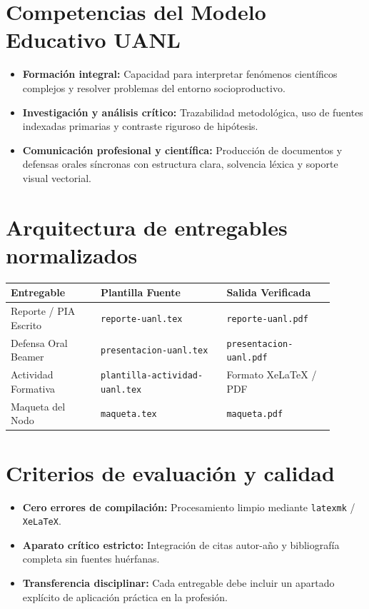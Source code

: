 \documentclass[12pt]{article}
\begin{document}
\section*{Competencias del Modelo Educativo UANL}
\begin{itemize}[leftmargin=*]
  \item \textbf{Formación integral:} Capacidad para interpretar fenómenos científicos complejos y resolver problemas del entorno socioproductivo.
  \item \textbf{Investigación y análisis crítico:} Trazabilidad metodológica, uso de fuentes indexadas primarias y contraste riguroso de hipótesis.
  \item \textbf{Comunicación profesional y científica:} Producción de documentos y defensas orales síncronas con estructura clara, solvencia léxica y soporte visual vectorial.
\end{itemize}

\section*{Arquitectura de entregables normalizados}
\begin{center}
\begin{tabular}{p{0.25\linewidth} p{0.35\linewidth} p{0.30\linewidth}}
\toprule
\textbf{Entregable} & \textbf{Plantilla Fuente} & \textbf{Salida Verificada} \\
\midrule
Reporte / PIA Escrito & \texttt{reporte-uanl.tex} & \texttt{reporte-uanl.pdf} \\
Defensa Oral Beamer & \texttt{presentacion-uanl.tex} & \texttt{presentacion-uanl.pdf} \\
Actividad Formativa & \texttt{plantilla-actividad-uanl.tex} & Formato XeLaTeX / PDF \\
Maqueta del Nodo & \texttt{maqueta.tex} & \texttt{maqueta.pdf} \\
\bottomrule
\end{tabular}
\end{center}

\section*{Criterios de evaluación y calidad}
\begin{itemize}[leftmargin=*]
  \item \textbf{Cero errores de compilación:} Procesamiento limpio mediante \texttt{latexmk} / \texttt{XeLaTeX}.
  \item \textbf{Aparato crítico estricto:} Integración de citas autor-año y bibliografía completa sin fuentes huérfanas.
  \item \textbf{Transferencia disciplinar:} Cada entregable debe incluir un apartado explícito de aplicación práctica en la profesión.
\end{itemize}
\end{document}
